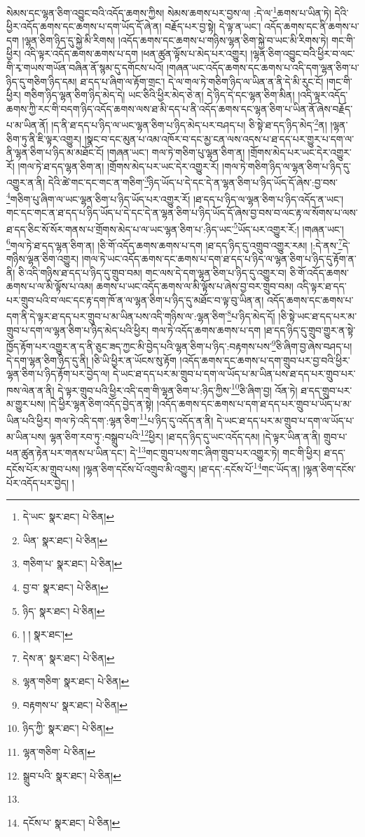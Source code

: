 སེམས་དང་ལྷན་ཅིག་འབྱུང་བའི་འདོད་ཆགས་ཀྱིས། སེམས་ཆགས་པར་བྱས་ལ། :དེ་ལ་\footnote{དེ་ཡང་  སྣར་ཐང་།  པེ་ཅིན། }ཆགས་པ་ཡིན་ཏེ། དེའི་ཕྱིར་འདོད་ཆགས་དང་ཆགས་པ་དག་ཡོད་དོ་ཞེ་ན། བརྗོད་པར་བྱ་སྟེ། དེ་ལྟ་ན་ཡང་། འདོད་ཆགས་དང་ནི་ཆགས་པ་དག །ལྷན་ཅིག་ཉིད་དུ་སྐྱེ་མི་རིགས། །འདོད་ཆགས་དང་ཆགས་པ་གཉིས་ལྷན་ཅིག་སྐྱེ་བ་ཡང་མི་རིགས་ཏེ། གང་གི་ཕྱིར། འདི་ལྟར་འདོད་ཆགས་ཆགས་པ་དག །ཕན་ཚུན་ལྟོས་པ་མེད་པར་འགྱུར། །ལྷན་ཅིག་འབྱུང་བའི་ཕྱིར་བ་ལང་གི་རྭ་གཡས་གཡོན་བཞིན་ནོ་སྙམ་དུ་དགོངས་པའོ། །གཞན་ཡང་འདོད་ཆགས་དང་ཆགས་པ་འདི་དག་ལྷན་ཅིག་པ་ཉིད་དུ་གཅིག་ཉིད་དམ། ཐ་དད་པ་ཞིག་ལ་རྟོག་གྲང་། དེ་ལ་གལ་ཏེ་གཅིག་ཉིད་ལ་ཡིན་ན་ནི་དེ་མི་རུང་ངོ། །གང་གི་ཕྱིར། གཅིག་ཉིད་ལྷན་ཅིག་ཉིད་མེད་དེ། ཡང་ཅིའི་ཕྱིར་མེད་ཅེ་ན། དེ་ཉིད་དེ་དང་ལྷན་ཅིག་མིན། །འདི་ལྟར་འདོད་ཆགས་ཀྱི་རང་གི་བདག་ཉིད་འདོད་ཆགས་ལས་ཐ་མི་དད་པ་ནི་འདོད་ཆགས་དང་ལྷན་ཅིག་པ་ཡིན་ནོ་ཞེས་བརྗོད་པ་མ་ཡིན་ནོ། །ད་ནི་ཐ་དད་པ་ཉིད་ལ་ཡང་ལྷན་ཅིག་པ་ཉིད་མེད་པར་བཤད་པ། ཅི་སྟེ་ཐ་དད་ཉིད་མེད་\footnote{ཡིན་  སྣར་ཐང་།  པེ་ཅིན། }ན། །ལྷན་ཅིག་ཏུ་ནི་ཇི་ལྟར་འགྱུར། །སྣང་བ་དང་མུན་པ་འམ་འཁོར་བ་དང་མྱ་ངན་ལས་འདས་པ་ཐ་དད་པར་གྱུར་པ་དག་ལ་ནི་ལྷན་ཅིག་པ་ཉིད་མ་མཐོང་ངོ། །གཞན་ཡང་། གལ་ཏེ་གཅིག་པུ་ལྷན་ཅིག་ན། །གྲོགས་མེད་པར་ཡང་དེར་འགྱུར་རོ། །གལ་ཏེ་ཐ་དད་ལྷན་ཅིག་ན། །གྲོགས་མེད་པར་ཡང་དེར་འགྱུར་རོ། །གལ་ཏེ་གཅིག་ཉིད་ལ་ལྷན་ཅིག་པ་ཉིད་དུ་འགྱུར་ན་ནི། དེའི་ཚེ་གང་དང་གང་ན་གཅིག་\footnote{གཅིག་པ་  སྣར་ཐང་།  པེ་ཅིན། }ཉིད་ཡོད་པ་དེ་དང་དེ་ན་ལྷན་ཅིག་པ་ཉིད་ཡོད་དོ་ཞེས་:བྱ་བས་\footnote{བྱ་བ་  སྣར་ཐང་།  པེ་ཅིན། }གཅིག་པུ་ཞིག་ལ་ཡང་ལྷན་ཅིག་པ་ཉིད་ཡོད་པར་འགྱུར་རོ། །ཐ་དད་པ་ཉིད་ལ་ལྷན་ཅིག་པ་ཉིད་འདོད་ན་ཡང་། གང་དང་གང་ན་ཐ་དད་པ་ཉིད་ཡོད་པ་དེ་དང་དེ་ན་ལྷན་ཅིག་པ་ཉིད་ཡོད་དོ་ཞེས་བྱ་བས་བ་ལང་རྟ་ལ་སོགས་པ་ལས་ཐ་དད་ཅིང་སོ་སོར་གནས་པ་གྲོགས་མེད་པ་ལ་ཡང་ལྷན་ཅིག་པ་:ཉིད་ཡང་\footnote{ཉིད་  སྣར་ཐང་།  པེ་ཅིན། }ཡོད་པར་འགྱུར་རོ:། །གཞན་ཡང་། \footnote{། །   སྣར་ཐང་། }གལ་ཏེ་ཐ་དད་ལྷན་ཅིག་ན། །ཅི་གོ་འདོད་ཆགས་ཆགས་པ་དག །ཐ་དད་ཉིད་དུ་འགྲུབ་འགྱུར་རམ། །:དེ་ནས་\footnote{དེས་ན་  སྣར་ཐང་།  པེ་ཅིན། }དེ་གཉིས་ལྷན་ཅིག་འགྱུར། །གལ་ཏེ་ཡང་འདོད་ཆགས་དང་ཆགས་པ་དག་ཐ་དད་པ་ཉིད་ལ་ལྷན་ཅིག་པ་ཉིད་དུ་རྟོག་ན་ནི། ཅི་འདི་གཉིས་ཐ་དད་པ་ཉིད་དུ་གྲུབ་བམ། གང་ལས་དེ་དག་ལྷན་ཅིག་པ་ཉིད་དུ་འགྱུར་བ། ཅི་གོ་འདོད་ཆགས་ཆགས་པ་ལ་མི་ལྟོས་པ་འམ། ཆགས་པ་ཡང་འདོད་ཆགས་ལ་མི་ལྟོས་པ་ཞེས་བྱ་བར་གྲུབ་བམ། འདི་ལྟར་ཐ་དད་པར་གྲུབ་པའི་བ་ལང་དང་རྟ་དག་ཁོ་ན་ལ་ལྷན་ཅིག་པ་ཉིད་དུ་མཐོང་བ་ལྟ་བུ་ཡིན་ན། འདོད་ཆགས་དང་ཆགས་པ་དག་ནི་དེ་ལྟར་ཐ་དད་པར་གྲུབ་པ་མ་ཡིན་པས་འདི་གཉིས་ལ་:ལྷན་ཅིག་\footnote{ལྷན་གཅིག་  སྣར་ཐང་།  པེ་ཅིན། }པ་ཉིད་མེད་དོ། །ཅི་སྟེ་ཡང་ཐ་དད་པར་མ་གྲུབ་པ་དག་ལ་ལྷན་ཅིག་པ་ཉིད་མེད་པའི་ཕྱིར། གལ་ཏེ་འདོད་ཆགས་ཆགས་པ་དག །ཐ་དད་ཉིད་དུ་གྲུབ་གྱུར་ན་སྟེ་ཁྱོད་རྟོག་པར་འགྱུར་ན་ད་ནི་ཅུང་ཟད་ཀྱང་མི་བྱེད་པའི་ལྷན་ཅིག་པ་ཉིད་:བརྟགས་པས་\footnote{བརྟགས་པ་  སྣར་ཐང་།  པེ་ཅིན། }ཅི་ཞིག་བྱ་ཞེས་བཤད་པ། དེ་དག་ལྷན་ཅིག་ཉིད་དུ་ནི། །ཅི་ཡི་ཕྱིར་ན་ཡོངས་སུ་རྟོག །འདོད་ཆགས་དང་ཆགས་པ་དག་གྲུབ་པར་བྱ་བའི་ཕྱིར་ལྷན་ཅིག་པ་ཉིད་རྟོག་པར་བྱེད་ལ། དེ་ཡང་ཐ་དད་པར་མ་གྲུབ་པ་དག་ལ་ཡོད་པ་མ་ཡིན་པས་ཐ་དད་པར་གྲུབ་པར་ཁས་ལེན་ན་ནི། དེ་ལྟར་གྲུབ་པའི་ཕྱིར་འདི་དག་གི་ལྷན་ཅིག་པ་:ཉིད་ཀྱིས་\footnote{ཉིད་ཀྱི་  སྣར་ཐང་།  པེ་ཅིན། }ཅི་ཞིག་བྱ། འོན་ཏེ། ཐ་དད་གྲུབ་པར་མ་གྱུར་པས། །དེ་ཕྱིར་ལྷན་ཅིག་འདོད་བྱེད་ན་སྟེ། །འདོད་ཆགས་དང་ཆགས་པ་དག་ཐ་དད་པར་གྲུབ་པ་ཡོད་པ་མ་ཡིན་པའི་ཕྱིར། གལ་ཏེ་འདི་དག་:ལྷན་ཅིག་\footnote{ལྷན་གཅིག་  པེ་ཅིན། }པ་ཉིད་དུ་འདོད་ན་ནི། དེ་ཡང་ཐ་དད་པར་མ་གྲུབ་པ་དག་ལ་ཡོད་པ་མ་ཡིན་པས། ལྷན་ཅིག་རབ་ཏུ་:བསྒྲུབ་པའི་\footnote{སྒྲུབ་པའི་  སྣར་ཐང་།  པེ་ཅིན། }ཕྱིར། །ཐ་དད་ཉིད་དུ་ཡང་འདོད་དམ། །དེ་ལྟར་ཡིན་ན་ནི། གྲུབ་པ་ཕན་ཚུན་རྟེན་པར་གནས་པ་ཡིན་དང་། དེ་\footnote{}གང་གྲུབ་པས་གང་ཞིག་གྲུབ་པར་འགྱུར་ཏེ། གང་གི་ཕྱིར། ཐ་དད་དངོས་པོར་མ་གྲུབ་པས། །ལྷན་ཅིག་དངོས་པོ་འགྲུབ་མི་འགྱུར། །ཐ་དད་:དངོས་པོ་\footnote{དངོས་པ་  སྣར་ཐང་།  པེ་ཅིན། }གང་ཡོད་ན། །ལྷན་ཅིག་དངོས་པོར་འདོད་པར་བྱེད། །
